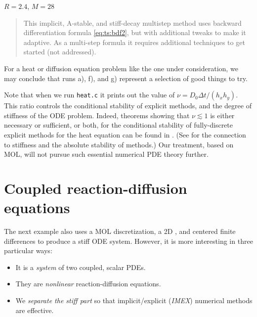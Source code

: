 \begin{enumerate}
\hfill $R=2.4$, $M=28$
\begin{quote} This implicit, A-stable, and stiff-decay multistep method \citep{AscherPetzold1998} uses backward differentiation formula \eqref{eq:ts:bdf2}, but with additional tweaks to make it adaptive.  As a multi-step formula it requires additional techniques to get started (not addressed).\end{quote}
\end{enumerate}

For a heat or diffusion equation problem like the one under consideration, we may conclude that runs a), f), and g) represent a selection of good things to try.

Note that when we run \texttt{heat.c} it prints out the value of $\nu = D_0 \Delta t / (h_x h_y)$.  This ratio controls the conditional stability of explicit methods, and the degree of stiffness of the ODE problem.  Indeed, theorems showing that $\nu \lesssim 1$ is either necessary or sufficient, or both, for the conditional stability of fully-discrete explicit methods for the heat equation can be found in \citep{MortonMayers2005}.  (See \citep{LeVeque2007} for the connection to stiffness and the absolute stability of methods.)  Our treatment, based on MOL, will not pursue such essential numerical PDE theory further.


\section{Coupled reaction-diffusion equations}

The next example also uses a MOL discretization, a 2D \pDMDA, and centered finite differences to produce a stiff ODE system.  However, it is more interesting in three particular ways:
\begin{itemize}
\item It is a \emph{system} of two coupled, scalar PDEs.
\item They are \emph{nonlinear} reaction-diffusion equations.
\item We \emph{separate the stiff part} so that implicit/explicit (\emph{IMEX}) numerical methods are effective.
\end{itemize}

